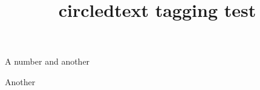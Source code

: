 \documentclass{article}
\title{circledtext tagging test}
\begin{document}
A number  and another 

Another 
\end{document}
